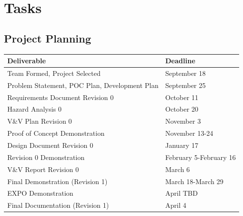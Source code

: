 \documentclass[12pt]{article}
\begin{document}
\section{Tasks}
\subsection{Project Planning}
\begin{table}[]
    \begin{tabular}{|l|l|}
    \hline
    \textbf{Deliverable}                          & \textbf{Deadline}      \\ \hline
    Team Formed, Project Selected                 & September 18           \\ \hline
    Problem Statement, POC Plan, Development Plan & September 25           \\ \hline
    Requirements Document Revision 0              & October 11             \\ \hline
    Hazard Analysis 0                             & October 20             \\ \hline
    V\&V Plan Revision 0                          & November 3             \\ \hline
    Proof of Concept Demonstration                & November 13-24         \\ \hline
    Design Document Revision 0                    & January 17             \\ \hline
    Revision 0 Demonstration                      & February 5-February 16 \\ \hline
    V\&V Report Revision 0                        & March 6                \\ \hline
    Final Demonstration (Revision 1)              & March 18-March 29      \\ \hline
    EXPO Demonstration                            & April TBD              \\ \hline
    Final Documentation (Revision 1)              & April 4                \\ \hline
    \end{tabular}
\end{table}
\end{document}
